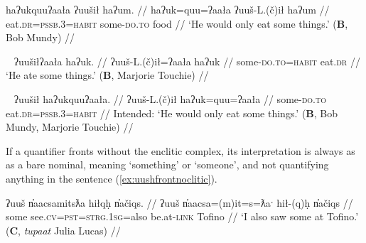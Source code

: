 \ex \label{ex:uushilnofront}
\begingl
\glpreamble haʔukquuʔaała ʔuušił haʔum. //
\gla haʔuk=quu=ʔaała ʔuuš-L.(č)ił haʔum //
\glb eat.\textsc{dr}=\textsc{pssb.3}=\textsc{habit} some-\textsc{do.to} food //
\glft `He would only eat some things.' (\textbf{B}, Bob Mundy) //
\endgl
\xe

\ex~ \label{ex:uushilfront}
\begingl
\glpreamble ʔuušiłʔaała haʔuk. //
\gla ʔuuš-L.(č)ił=ʔaała haʔuk  //
\glb some-\textsc{do.to}=\textsc{habit} eat.\textsc{dr} //
\glft `He ate some things.' (\textbf{B}, Marjorie Touchie) //
\endgl
\xe

\ex~ \label{*ex:uushilfront}
\begingl
\glpreamble *ʔuušił haʔukquuʔaała. //
\gla ʔuuš-L.(č)ił haʔuk=quu=ʔaała  //
\glb some-\textsc{do.to} eat.\textsc{dr}=\textsc{pssb.3}=\textsc{habit} //
\glft Intended: `He would only eat some things.' (\textbf{B}, Bob Mundy, Marjorie Touchie) //
\endgl
\xe

\begin{comment}
I have not done a deep investigation into the conditions that determine whether the second-position complex falls on the fronted quantifier or on the following predicate. In fact, this may vary by quantifier type. I have examples in my data of the fronted quantifier \textit{ʔuuš} taking the clitics (\ref{ex:uushfrontclitic}) or not (\ref{ex:uushfrontnoclitic}).

\ex \label{ex:uushfrontclitic}
\begingl
\glpreamble k̓umaaw̓it̓asʔaƛquu, n̓aačukitʔišʔaałʔał ʔin hiłʔapitʔaałʔał suč̓as, \textbf{ʔuušʔaƛquu wiikapuƛ}. //
\gla k̓um-(y)aˑ-w̓it̓as=!aƛ=quu, n̓aačuk=(m)it=ʔiˑš=ʔaał=ʔał ʔin hił=!ap=(m)it=ʔaał=ʔał suč̓as, \textbf{ʔuuš=ʔaƛ=quu wiikapuƛ}  //
\glb point-\textsc{cv}-going.to=\textsc{now}=\textsc{pssb.3} look.\textsc{dr}=\textsc{pst}=\textsc{strg.3}=\textsc{habit}=\textsc{pl} \textsc{comp} be.at=\textsc{caus}=\textsc{pst}=\textsc{habit}=\textsc{pl} tree, \textbf{some=\textsc{now}=\textsc{pssb.3} pass.away.\textsc{mo}} //
\glft `If he is going to be pointer, they look to see if they put (someone) in a tree, if someone has passed away.' (\textbf{C}, \textit{tupaat} Julia Lucas) //
\endgl
\xe
\end{comment}

If a quantifier fronts without the enclitic complex, its interpretation is always as as a bare nominal, meaning `something' or `someone', and not quantifying anything in the sentence (\ref{ex:uushfrontnoclitic}).

\ex \label{ex:uushfrontnoclitic}
\begingl
\glpreamble ʔuuš n̓aacsamitsƛa hiłqḥ n̓ačiqs. //
\gla ʔuuš n̓aacsa=(m)it=s=ƛaˑ hił-(q)ḥ n̓ačiqs  //
\glb some see.\textsc{cv}=\textsc{pst}=\textsc{strg.1sg}=also be.at-\textsc{link} Tofino //
\glft `I also saw some at Tofino.' (\textbf{C}, \textit{tupaat} Julia Lucas) //
\endgl
\xe

